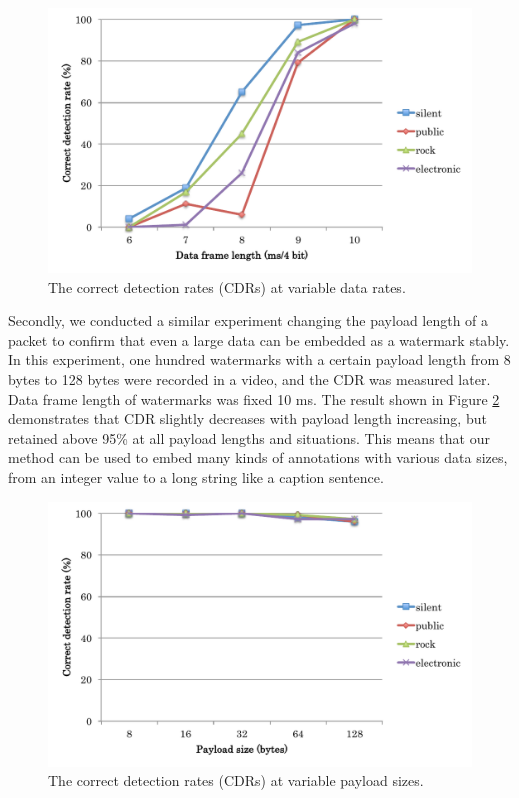 \begin{figure}[htbp]
 \begin{center}
  \includegraphics[width=120mm]{evaluation_reliability_bitrate.pdf}
 \end{center}
 \caption{The correct detection rates (CDRs) at variable data rates.}
 \label{fig:eval_reli_btrt}
\end{figure}

Secondly, we conducted a similar experiment changing the payload length of a packet to confirm that even a large data can be embedded as a watermark stably.
In this experiment, one hundred watermarks with a certain payload length from 8 bytes to 128 bytes were recorded in a video, and the CDR was measured later.
Data frame length of watermarks was fixed 10 ms.
The result shown in Figure \ref{fig:eval_reli_pyld} demonstrates that CDR slightly decreases with payload length increasing, but retained above 95\% at all payload lengths and situations.
This means that our method can be used to embed many kinds of annotations with various data sizes, from an integer value to a long string like a caption sentence.

\begin{figure}[htbp]
 \begin{center}
  \includegraphics[width=120mm]{evaluation_reliability_payload.pdf}
 \end{center}
 \caption{The correct detection rates (CDRs) at variable payload sizes.}
 \label{fig:eval_reli_pyld}
\end{figure}

